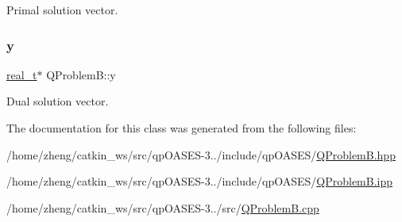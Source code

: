 Primal solution vector. \mbox{\label{class_q_problem_b_a3fcf4f7abdb0189fd304e6bd31431d4f}} 
\subsubsection{\texorpdfstring{y}{y}}
{\footnotesize\ttfamily \hyperlink{qp_o_a_s_e_s__wrapper_8h_a0d00e2b3dfadee81331bbb39068570c4}{real\+\_\+t}$\ast$ Q\+Problem\+B\+::y\hspace{0.3cm}{\ttfamily [protected]}}

Dual solution vector. 

The documentation for this class was generated from the following files\+:\begin{DoxyCompactItemize}
\item 
/home/zheng/catkin\+\_\+ws/src/qp\+O\+A\+S\+E\+S-\/3../include/qp\+O\+A\+S\+E\+S/\hyperlink{_q_problem_b_8hpp}{Q\+Problem\+B.\+hpp}\item 
/home/zheng/catkin\+\_\+ws/src/qp\+O\+A\+S\+E\+S-\/3../include/qp\+O\+A\+S\+E\+S/\hyperlink{_q_problem_b_8ipp}{Q\+Problem\+B.\+ipp}\item 
/home/zheng/catkin\+\_\+ws/src/qp\+O\+A\+S\+E\+S-\/3../src/\hyperlink{_q_problem_b_8cpp}{Q\+Problem\+B.\+cpp}\end{DoxyCompactItemize}
